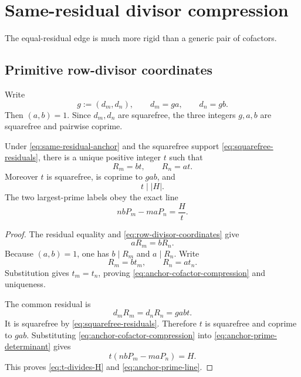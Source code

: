 \section{Same-residual divisor compression}
\label{sec:anchor-compression}

The equal-residual edge is much more rigid than a generic pair of
cofactors.

\subsection{Primitive row-divisor coordinates}

Write
\begin{equation}
 g:=(d_m,d_n),\qquad
 d_m=ga,\qquad d_n=gb.
 \label{eq:row-divisor-coordinates}
\end{equation}
Then \((a,b)=1\).  Since \(d_m,d_n\) are squarefree, the three integers
\(g,a,b\) are squarefree and pairwise coprime.

\begin{theorem}
\label{thm:anchor-compression}
Under \eqref{eq:same-residual-anchor} and the squarefree support
\eqref{eq:squarefree-residuals}, there is a unique positive integer \(t\)
such that
\begin{equation}
 \boxed{R_m=bt,\qquad R_n=at.}
 \label{eq:anchor-cofactor-compression}
\end{equation}
Moreover \(t\) is squarefree, is coprime to \(gab\), and
\begin{equation}
 \boxed{t\mid |H|.}
 \label{eq:t-divides-H}
\end{equation}
The two largest-prime labels obey the exact line
\begin{equation}
 \boxed{nbP_m-maP_n=\frac{H}{t}.}
 \label{eq:anchor-prime-line}
\end{equation}
\end{theorem}

\begin{proof}
The residual equality and \eqref{eq:row-divisor-coordinates} give
\[
 aR_m=bR_n.
\]
Because \((a,b)=1\), one has \(b\mid R_m\) and \(a\mid R_n\).  Write
\[
 R_m=bt_m,\qquad R_n=at_n.
\]
Substitution gives \(t_m=t_n\), proving
\eqref{eq:anchor-cofactor-compression} and uniqueness.

The common residual is
\[
 d_mR_m=d_nR_n=gabt.
\]
It is squarefree by \eqref{eq:squarefree-residuals}.  Therefore \(t\) is
squarefree and coprime to \(gab\).  Substituting
\eqref{eq:anchor-cofactor-compression} into
\eqref{eq:anchor-prime-determinant} gives
\[
 t(nbP_m-maP_n)=H.
\]
This proves \eqref{eq:t-divides-H} and
\eqref{eq:anchor-prime-line}.
\end{proof}

